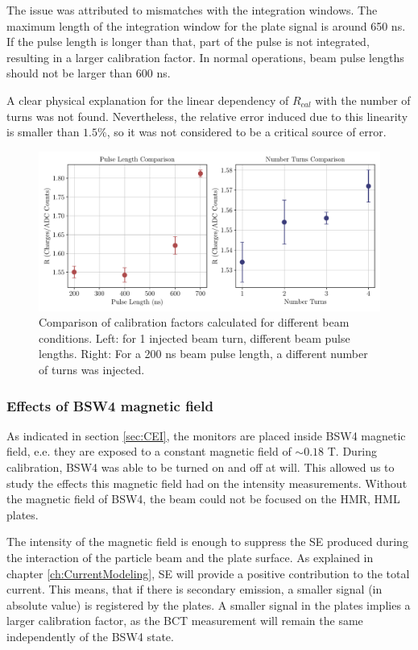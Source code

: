 The issue was attributed to mismatches with the integration windows. The maximum length of the integration window for the plate signal is around 650 ns. If the pulse length is longer than that, part of the pulse is not integrated, resulting in a larger calibration factor. In normal operations, beam pulse lengths should not be larger than 600 ns. 

A clear physical explanation for the linear dependency of $R_{cal}$ with the number of turns was not found. Nevertheless, the relative error induced due to this linearity is smaller than $1.5 \%$, so it was not considered to be a critical source of error. 

\begin{figure}[h]
    \centering
    \includegraphics[width=1.0\columnwidth]{Figure_CalFactorLinearity/CalfacLin.pdf}
    \caption{Comparison of calibration factors calculated for different beam conditions.  Left: for 1 injected beam turn, different beam pulse lengths. Right: For a 200 ns beam pulse length, a different number of turns was injected. }
    \label{fig:CalfacPlenNturn}
\end{figure}

\subsubsection{Effects of BSW4 magnetic field}
\label{sec:SEBSW4}

As indicated in section \ref{sec:CEI}, the \hzhm monitors are placed inside BSW4 magnetic field, e.e. they are exposed to a constant magnetic field of $\sim 0.18 $ T. During calibration, BSW4 was able to be turned on and off at will. This allowed us to study the effects this magnetic field had on the intensity measurements. Without the magnetic field of BSW4, the beam could not be focused on the HMR, HML plates. 

The intensity of the magnetic field is enough to suppress the SE produced during the interaction of the particle beam and the plate surface. As explained in chapter \ref{ch:CurrentModeling}, SE will provide a positive contribution to the total current. This means, that if there is secondary emission, a smaller signal (in absolute value) is registered by the plates. A smaller signal in the plates implies a larger calibration factor, as the BCT measurement will remain the same independently of the BSW4 state. 

